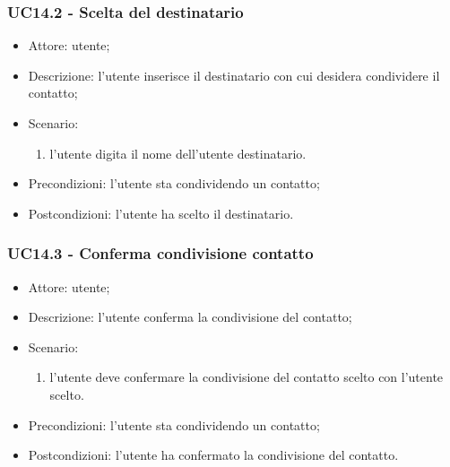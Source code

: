 \subsubsection{UC14.2 - Scelta del destinatario} \label{sec: UC14.2}
\begin{itemize}
    \item Attore: utente;
    \item Descrizione: l'utente inserisce il destinatario con cui desidera condividere il contatto;
    \item Scenario:
        \begin{enumerate}
        \item l'utente digita il nome dell'utente destinatario.
        \end{enumerate}
    
    \item Precondizioni: l'utente sta condividendo un contatto;
    \item Postcondizioni: l'utente ha scelto il destinatario.
\end{itemize}


\subsubsection{UC14.3 - Conferma condivisione contatto} \label{sec: UC14.3}
\begin{itemize}
    \item Attore: utente;
    \item Descrizione: l'utente conferma la condivisione del contatto;
    \item Scenario:
        \begin{enumerate}
        \item l'utente deve confermare la condivisione del contatto scelto con l'utente scelto.
        \end{enumerate}
    
    \item Precondizioni: l'utente sta condividendo un contatto;
    \item Postcondizioni: l'utente ha confermato la condivisione del contatto.
\end{itemize}

